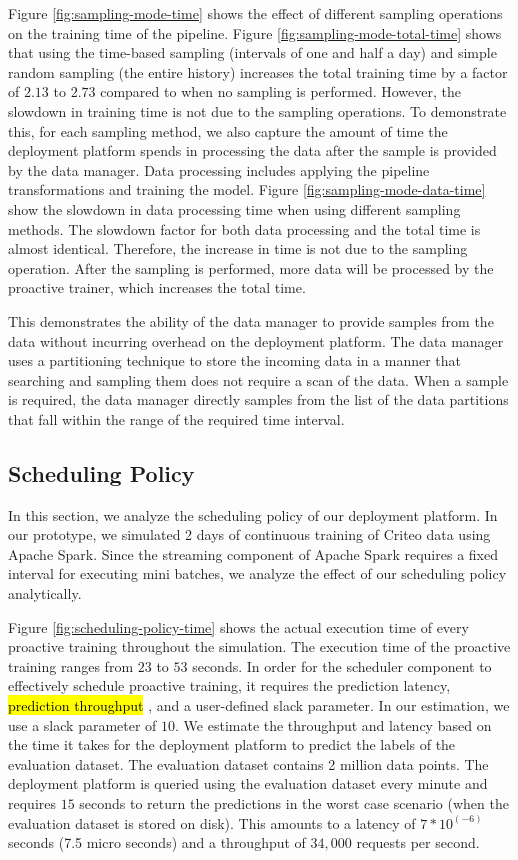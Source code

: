 Figure \ref{fig:sampling-mode-time} shows the effect of different sampling operations on the training time of the pipeline.
Figure \ref{fig:sampling-mode-total-time} shows that using the time-based sampling (intervals of one and half a day) and simple random sampling (the entire history) increases the total training time by a factor of $2.13$ to $2.73$ compared to when no sampling is performed.
However, the slowdown in training time is not due to the sampling operations.
To demonstrate this, for each sampling method, we also capture the amount of time the deployment platform spends in processing the data after the sample is provided by the data manager.
Data processing includes applying the pipeline transformations and training the model.
Figure \ref{fig:sampling-mode-data-time} show the slowdown in data processing time when using different sampling methods.
The slowdown factor for both data processing and the total time is almost identical.
Therefore, the increase in time is not due to the sampling operation.
After the sampling is performed, more data will be processed by the proactive trainer, which increases the total time.

This demonstrates the ability of the data manager to provide samples from the data without incurring overhead on the deployment platform.
The data manager uses a partitioning technique to store the incoming data in a manner that searching and sampling them does not require a scan of the data.
When a sample is required, the data manager directly samples from the list of the data partitions that fall within the range of the required time interval.

\subsection{Scheduling Policy}
In this section, we analyze the scheduling policy of our deployment platform.
In our prototype, we simulated 2 days of continuous training of Criteo data using Apache Spark.
Since the streaming component of Apache Spark requires a fixed interval for executing mini batches, we analyze the effect of our scheduling policy analytically.

Figure \ref{fig:scheduling-policy-time} shows the actual execution time of every proactive training throughout the simulation.
The execution time of the proactive training ranges from $23$ to $53$ seconds.
In order for the scheduler component to effectively schedule proactive training, it requires the prediction latency, \hl{prediction throughput} , and a user-defined slack parameter.
In our estimation, we use a slack parameter of $10$.
We estimate the throughput and latency based on the time it takes for the deployment platform to predict the labels of the evaluation dataset.
The evaluation dataset contains 2 million data points.
The deployment platform is queried using the evaluation dataset every minute and requires $15$ seconds to return the predictions in the worst case scenario (when the evaluation dataset is stored on disk). 
This amounts to a latency of $7 * 10 ^ {(-6)}$ seconds (7.5 micro seconds) and a throughput of $34,000$ requests per second.

